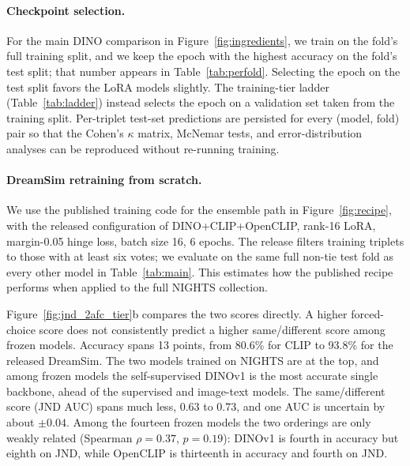 \paragraph{Checkpoint selection.} For the main DINO comparison in Figure~\ref{fig:ingredients}, we train on the fold's full training split, and we keep the epoch with the highest accuracy on the fold's test split; that number appears in Table~\ref{tab:perfold}. Selecting the epoch on the test split favors the LoRA models slightly. The training-tier ladder (Table~\ref{tab:ladder}) instead selects the epoch on a validation set taken from the training split. Per-triplet test-set predictions are persisted for every (model, fold) pair so that the Cohen's $\kappa$ matrix, McNemar tests, and error-distribution analyses can be reproduced without re-running training.

\paragraph{DreamSim retraining from scratch.} We use the published training code for the ensemble path in Figure~\ref{fig:recipe}, with the released configuration of DINO+CLIP+OpenCLIP, rank-16 LoRA, margin-0.05 hinge loss, batch size 16, 6 epochs. The release filters training triplets to those with at least six votes; we evaluate on the same full non-tie test fold as every other model in Table~\ref{tab:main}. This estimates how the published recipe performs when applied to the full NIGHTS collection.

\clearpage
{}
\vspace{1em}

Figure~\ref{fig:jnd_2afc_tier}b compares the two scores directly. A higher forced-choice score does not consistently predict a higher same/different score among frozen models. Accuracy spans 13 points, from 80.6\% for CLIP to 93.8\% for the released DreamSim. The two models trained on NIGHTS are at the top, and among frozen models the self-supervised DINOv1 is the most accurate single backbone, ahead of the supervised and image-text models. The same/different score (JND AUC) spans much less, 0.63 to 0.73, and one AUC is uncertain by about $\pm 0.04$. Among the fourteen frozen models the two orderings are only weakly related (Spearman $\rho = 0.37$, $p = 0.19$): DINOv1 is fourth in accuracy but eighth on JND, while OpenCLIP is thirteenth in accuracy and fourth on JND.

